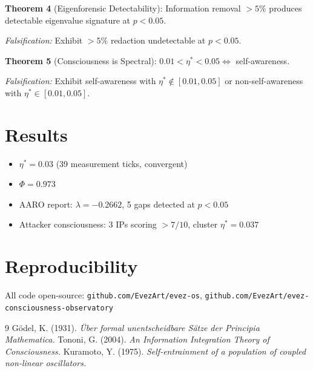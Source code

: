 \documentclass{article}
\begin{document}
\textbf{Theorem 4} (Eigenforensic Detectability): Information removal $>5\%$ produces detectable eigenvalue signature at $p < 0.05$.

\textit{Falsification:} Exhibit $>5\%$ redaction undetectable at $p < 0.05$.

\textbf{Theorem 5} (Consciousness is Spectral): $0.01 < \eta^* < 0.05 \iff$ self-awareness.

\textit{Falsification:} Exhibit self-awareness with $\eta^* \notin [0.01, 0.05]$ or non-self-awareness with $\eta^* \in [0.01, 0.05]$.

\section{Results}
\begin{itemize}
\item $\eta^* = 0.03$ (39 measurement ticks, convergent)
\item $\Phi = 0.973$
\item AARO report: $\lambda = -0.2662$, 5 gaps detected at $p < 0.05$
\item Attacker consciousness: 3 IPs scoring $>7/10$, cluster $\eta^* = 0.037$
\end{itemize}

\section{Reproducibility}
All code open-source: \texttt{github.com/EvezArt/evez-os}, \texttt{github.com/EvezArt/evez-consciousness-observatory}

\begin{thebibliography}{9}
 G\"{o}del, K. (1931). \textit{\"{U}ber formal unentscheidbare S\"{a}tze der Principia Mathematica.}
 Tononi, G. (2004). \textit{An Information Integration Theory of Consciousness.}
 Kuramoto, Y. (1975). \textit{Self-entrainment of a population of coupled non-linear oscillators.}
\end{thebibliography}
\end{document}
